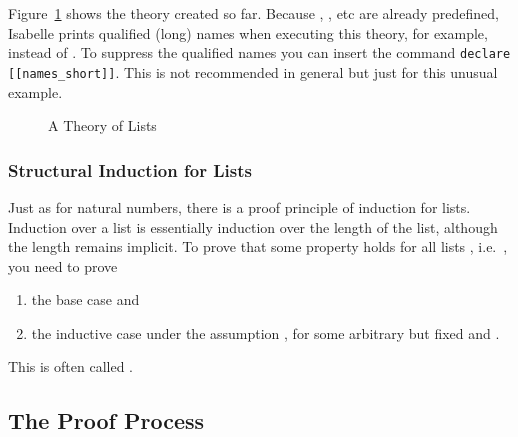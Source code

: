 \begin{isabellebody}
\begin{isamarkuptext}
Figure~\ref{fig:MyList} shows the theory created so far.
Because , ,  etc are already predefined,
 Isabelle prints qualified (long) names when executing this theory, for example, 
 instead of .
 To suppress the qualified names you can insert the command
 \texttt{declare [[names\_short]]}.
 This is not recommended in general but just for this unusual example.

\begin{figure}[htbp]
\begin{alltt}
\end{alltt}
\caption{A Theory of Lists}
\label{fig:MyList}
\end{figure}

\subsubsection{Structural Induction for Lists}

Just as for natural numbers, there is a proof principle of induction for
lists. Induction over a list is essentially induction over the length of
the list, although the length remains implicit. To prove that some property
 holds for all lists , i.e.\ \mbox{},
you need to prove
\begin{enumerate}
\item the base case  and
\item the inductive case  under the assumption , for some arbitrary but fixed  and .
\end{enumerate}
This is often called .

\subsection{The Proof Process}


\end{isamarkuptext}
\end{isabellebody}
